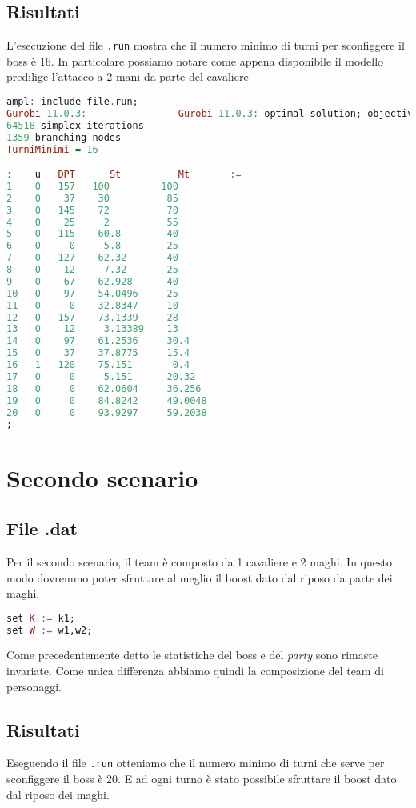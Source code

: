 \documentclass[12pt]{article}
\begin{document}
\subsection{Risultati}
L’esecuzione del file \texttt{.run} mostra che il numero minimo di turni per sconfiggere il boss è 16. In particolare possiamo notare come appena disponibile il modello predilige l'attacco a 2 mani da parte del cavaliere
\begin{lstlisting}[language=haskell, frame=single, captionpos=b, keywordstyle=\color{purple}]  
ampl: include file.run;
Gurobi 11.0.3:                Gurobi 11.0.3: optimal solution; objective 16
64518 simplex iterations
1359 branching nodes
TurniMinimi = 16

:    u   DPT      St          Mt       :=
1    0   157   100         100
2    0    37    30          85
3    0   145    72          70
4    0    25     2          55
5    0   115    60.8        40
6    0     0     5.8        25
7    0   127    62.32       40
8    0    12     7.32       25
9    0    67    62.928      40
10   0    97    54.0496     25
11   0     0    32.8347     10
12   0   157    73.1339     28
13   0    12     3.13389    13
14   0    97    61.2536     30.4
15   0    37    37.8775     15.4
16   1   120    75.151       0.4
17   0     0     5.151      20.32
18   0     0    62.0604     36.256
19   0     0    84.8242     49.0048
20   0     0    93.9297     59.2038
;
\end{lstlisting}
\newpage
\section{Secondo scenario}
\subsection{File .dat}
Per il secondo scenario, il team è composto da 1 cavaliere e 2 maghi. In questo modo dovremmo poter sfruttare al meglio il boost dato dal riposo da parte dei maghi.
\begin{lstlisting}[language=haskell, frame=single, captionpos=b, keywordstyle=\color{purple}]  
set K := k1;
set W := w1,w2;
\end{lstlisting}
Come precedentemente detto le statistiche del boss e del \textit{party} sono rimaste invariate. Come unica differenza abbiamo quindi la composizione del team di personaggi.
\subsection{Risultati}
Eseguendo il file \texttt{.run} otteniamo che il numero minimo di turni che serve per sconfiggere il boss è 20. E ad ogni turno è stato possibile sfruttare il boost dato dal riposo dei maghi.
\end{document}
